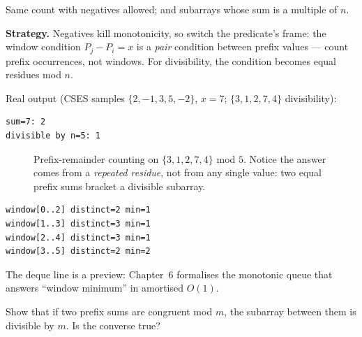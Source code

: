 \begin{example}\label{ex:sums2}
Same count with negatives allowed; and subarrays whose sum is a
multiple of $n$.
\par\smallskip
\textbf{Strategy.} Negatives kill monotonicity, so switch the
predicate's frame: the window condition $P_j - P_i = x$ is a
\emph{pair} condition between prefix values --- count prefix
occurrences, not windows. For divisibility, the condition becomes
equal residues mod $n$.
\par\smallskip
\begin{solution}

Real output (CSES samples $\{2,-1,3,5,-2\}$, $x{=}7$;
$\{3,1,2,7,4\}$ divisibility):
\begin{lstlisting}[numbers=none]
sum=7: 2
divisible by n=5: 1
\end{lstlisting}
\end{solution}
\end{example}

\begin{figure}[ht]\centering

\caption{Prefix-remainder counting on $\{3,1,2,7,4\}$ mod $5$.
Notice the answer comes from a \emph{repeated residue}, not from any
single value: two equal prefix sums bracket a divisible subarray.}
\label{fig:buckets}
\end{figure}

\begin{lstlisting}[numbers=none,caption={\texttt{window\_demo.cpp}:
sliding distinct-count and deque minimum preview.},label={lst:window}]
window[0..2] distinct=2 min=1
window[1..3] distinct=3 min=1
window[2..4] distinct=3 min=1
window[3..5] distinct=2 min=2
\end{lstlisting}

The deque line is a preview: Chapter~6 formalises the monotonic queue
that answers ``window minimum'' in amortised $O(1)$.

\begin{exercise}[medium]\label{exr:remainder}
Show that if two prefix sums are congruent mod $m$, the subarray
between them is divisible by $m$. Is the converse true?
\end{exercise}

